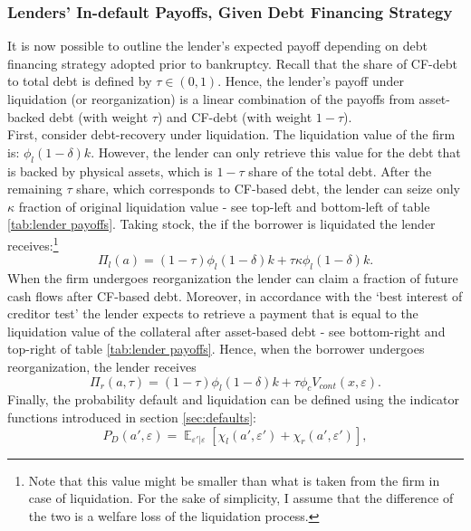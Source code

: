\documentclass[12pt]{article}
\DeclareMathOperator{\E}{\mathbb{E}}
\begin{document}
\subsubsection{Lenders' In-default Payoffs, Given Debt Financing Strategy}   \label{sec:Default Resolution}
It is now possible to outline the lender's expected payoff depending on debt financing strategy adopted prior to bankruptcy. Recall that the share of CF-debt to total debt is defined by $\tau \in (0,1)$. Hence, the lender's payoff under liquidation (or reorganization) is a linear combination of the payoffs from asset-backed debt (with weight $\tau$) and CF-debt (with weight $1-\tau$). \vspace{3mm} \\
First, consider debt-recovery under liquidation. The liquidation value of the firm is: $\phi_l (1-\delta) k$. However, the lender can only retrieve this value for the debt that is backed by physical assets, which is $1-\tau$ share of the total debt. After the remaining $\tau$ share, which corresponds to CF-based debt, the lender can seize only $\kappa$ fraction of original liquidation value - see top-left and bottom-left of table \ref{tab:lender payoffs}. Taking stock, the if the borrower is liquidated the lender receives:\footnote{Note that this value might be smaller than what is taken from the firm in case of liquidation. For the sake of simplicity, I assume that the difference of the two is a welfare loss of the liquidation process.}  
\begin{equation} \label{eq:P_liq} 
   \Pi_{l}(a) = (1-\tau) \phi_l (1-\delta) k +\tau \kappa \phi_l  (1-\delta) k. 
\end{equation}
When the firm undergoes reorganization the lender can claim a fraction of future cash flows after CF-based debt. Moreover, in accordance with the `best interest of creditor test' the lender expects to retrieve a payment that is equal to the liquidation value of the collateral after asset-based debt - see bottom-right and top-right of table \ref{tab:lender payoffs}. Hence, when the borrower undergoes reorganization, the lender receives
\begin{equation}  \label{eq:P_reorg}
   \Pi_{r}(a,\tau) = (1-\tau) \phi_l (1-\delta) k +\tau \phi_c V_{cont} (x, \varepsilon).
\end{equation}
Finally, the probability default and liquidation can be defined using the indicator functions introduced in section \ref{sec:defaults}: 
\begin{equation} \label{eq:default probability}
    P_D(a',\varepsilon) = \E_{\varepsilon'|\varepsilon}[\chi_l(a',\varepsilon') + \chi_r(a',\varepsilon')],
\end{equation}
\end{document}
